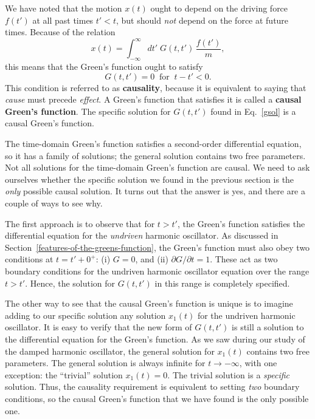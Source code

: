 \documentclass[10pt,a4paper]{article}
\begin{document}
We have noted that the motion $x(t)$ ought to depend on the driving
force $f(t')$ at all past times $t' < t$, but should \emph{not}
depend on the force at future times. Because of the relation
\begin{equation}
x(t) = \int_{-\infty}^\infty dt'\; G(t,t')\, \frac{f(t')}{m},
\end{equation}
this means that the Green's function ought to satisfy
\begin{equation}
G(t,t') = 0 \;\; \mathrm{for}\;\; t -t' < 0.
\end{equation}
This condition is referred to as \textbf{causality}, because it is
equivalent to saying that \emph{cause} must precede \emph{effect}. A
Green's function that satisfies it is called a \textbf{causal Green's
  function}. The specific solution for $G(t,t')$ found in
Eq.~\eqref{gsol} is a causal Green's function.

The time-domain Green's function satisfies a second-order differential
equation, so it has a family of solutions; the general solution contains
two free parameters. Not all solutions for the time-domain Green's
function are causal. We need to ask ourselves whether the specific
solution we found in the previous section is the \emph{only} possible
causal solution. It turns out that the answer is yes, and there are a
couple of ways to see why.

The first approach is to observe that for $t > t'$, the Green's
function satisfies the differential equation for the \emph{undriven}
harmonic oscillator.  As discussed in
Section~\ref{features-of-the-greens-function}, the Green's function
must also obey two conditions at $t = t' + 0^+$: (i) $G = 0$, and (ii)
$\partial G / \partial t = 1$. These act as two boundary conditions
for the undriven harmonic oscillator equation over the range $t > t'$.
Hence, the solution for $G(t,t')$ in this range is completely
specified.

The other way to see that the causal Green's function is unique is to
imagine adding to our specific solution any solution $x_1(t)$ for the
undriven harmonic oscillator. It is easy to verify that the new form
of $G(t,t')$ is still a solution to the differential equation for the
Green's function. As we saw during our study of the damped harmonic
oscillator, the general solution for $x_1(t)$ contains two free
parameters. The general solution is always infinite for $t \rightarrow
-\infty$, with one exception: the ``trivial'' solution $x_1(t) =
0$. The trivial solution is a \emph{specific} solution. Thus, the
causality requirement is equivalent to setting \emph{two} boundary
conditions, so the causal Green's function that we have found is the
only possible one.
\end{document}
